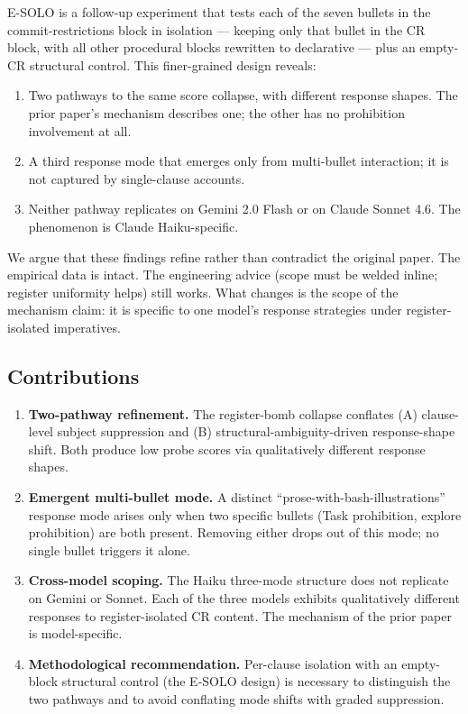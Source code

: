 \documentclass[11pt,a4paper]{article}
\begin{document}
E-SOLO is a follow-up experiment that tests each of the seven bullets
in the commit-restrictions block in isolation --- keeping only that
bullet in the CR block, with all other procedural blocks rewritten to
declarative --- plus an empty-CR structural control. This finer-grained
design reveals:

\begin{enumerate}[leftmargin=*]
\item Two pathways to the same score collapse, with different response
shapes. The prior paper's mechanism describes one; the other has no
prohibition involvement at all.

\item A third response mode that emerges only from multi-bullet
interaction; it is not captured by single-clause accounts.

\item Neither pathway replicates on Gemini 2.0 Flash or on
Claude Sonnet 4.6. The phenomenon is Claude Haiku-specific.
\end{enumerate}

We argue that these findings refine rather than contradict the
original paper. The empirical data is intact. The engineering advice
(scope must be welded inline; register uniformity helps) still works.
What changes is the scope of the mechanism claim: it is specific to
one model's response strategies under register-isolated imperatives.

\subsection{Contributions}

\begin{enumerate}[leftmargin=*]
\item \textbf{Two-pathway refinement.} The register-bomb collapse
conflates (A) clause-level subject suppression and (B)
structural-ambiguity-driven response-shape shift. Both produce low
probe scores via qualitatively different response shapes.

\item \textbf{Emergent multi-bullet mode.} A distinct
``prose-with-bash-illustrations'' response mode arises only when
two specific bullets (Task prohibition, explore prohibition) are
both present. Removing either drops out of this mode; no single
bullet triggers it alone.

\item \textbf{Cross-model scoping.} The Haiku three-mode structure
does not replicate on Gemini or Sonnet. Each of the three models
exhibits qualitatively different responses to register-isolated
CR content. The mechanism of the prior paper is model-specific.

\item \textbf{Methodological recommendation.} Per-clause isolation
with an empty-block structural control (the E-SOLO design) is
necessary to distinguish the two pathways and to avoid conflating
mode shifts with graded suppression.
\end{enumerate}
\end{document}
